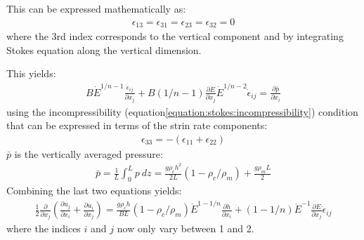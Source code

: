 \documentclass[letterpaper,10pt,english]{jupyterBook}
\begin{document}
\sphinxAtStartPar
This can be expressed mathematically as:
\begin{equation*}
\begin{split}\epsilon_{13}=\epsilon_{31}=\epsilon_{23}=\epsilon_{32}=0\end{split}
\end{equation*}
\sphinxAtStartPar
where the 3rd index corresponds to the vertical component and by integrating Stokes equation along the vertical dimension.

\sphinxAtStartPar
This yields:
\begin{equation*}
\begin{split}B\dot E^{1/n-1}\frac{\dot\epsilon_{ij}}{\partial x_j}+B(1/n-1)\frac{\partial \dot E}{\partial x_j}\dot E^{1/n-2}\dot\epsilon_{ij}=\frac{\partial\bar p}{\partial x_i}\end{split}
\end{equation*}
\sphinxAtStartPar
using the incompressibility (equation\eqref{equation:stokes:incompressibility}) condition that can be expressed in terms of the strin rate components:
\begin{equation*}
\begin{split}\epsilon_{33}=-(\epsilon_{11}+\epsilon_{22})\end{split}
\end{equation*}
\sphinxAtStartPar
\(\bar p\) is the vertically averaged pressure:
\begin{equation*}
\begin{split}\bar p=\frac{1}{L}\int_0^L p\ dz=\frac{g\rho_ch^2}{2L}(1-\rho_c/\rho_m)+\frac{g\rho_mL}{2}\end{split}
\end{equation*}
\sphinxAtStartPar
Combining the last two equations yields:
\begin{equation*}
\begin{split}\frac{1}{2}\frac{\partial}{\partial x_j}(\frac{\partial u_j}{\partial x_i}+\frac{\partial u_i}{\partial x_j})=\frac{g\rho_c h}{BL}(1-\rho_c/\rho_m)\dot E^{1-1/n}\frac{\partial h}{\partial x_i}+(1-1/n)\dot E^{-1}\frac{\partial\dot E}{\partial x_j}\dot\epsilon_{ij}\end{split}
\end{equation*}
\sphinxAtStartPar
where the indices \(i\) and \(j\) now only vary between 1 and 2.







\renewcommand{\indexname}{Index}
\printindex
\end{document}
